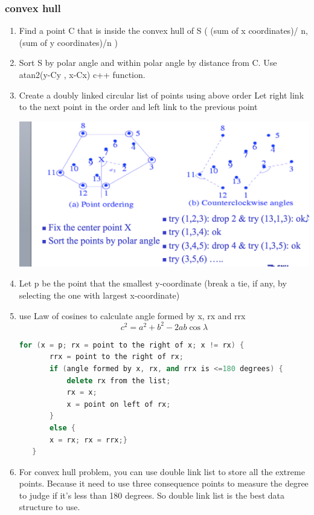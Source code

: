 \documentclass[a4paper,11pt,twoside]{book}
\begin{document}
\subsubsection{convex hull}

\begin{enumerate}
\item Find a point C that is inside the convex hull of S
( (sum of x coordinates)/ n, (sum of y coordinates)/n )
\item Sort S by polar angle and within polar angle by distance from C. Use atan2(y-Cy , x-Cx) c++ function.
\item Create a doubly linked circular list of points using above order
Let right link to the next point in the order and left link to the previous point

\includegraphics[scale=0.4]{pics/convex.png} \newline
\item Let p be the point that the smallest y-coordinate 
   (break a tie, if any, by selecting the one with largest x-coordinate)
   
\item use Law of cosines to calculate  angle formed by x, rx and rrx
\[
c^{2} = a^{2}+b^{2}-2ab\cos\lambda
\]

\begin{lstlisting}[frame=single, language=c++]
 for (x = p; rx = point to the right of x; x != rx) {
       rrx = point to the right of rx;
       if (angle formed by x, rx, and rrx is <=180 degrees) {
           delete rx from the list;
           rx = x; 
           x = point on left of rx;
       } 
       else { 
       x = rx; rx = rrx;}
   } 
\end{lstlisting}

\item For convex hull problem, you can use double link list to store all the extreme points. Because it need to use three consequence points to measure the degree to judge if it's less than 180 degrees. So double link list is the best data structure to use. 

\end{enumerate}
\end{document}
